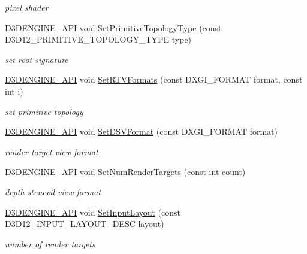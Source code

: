 \begin{DoxyCompactItemize}
\begin{DoxyCompactList}\small\item\em pixel shader \end{DoxyCompactList}\item 
\mbox{\hyperlink{stdafx_8h_a8ee2d990c5dfba7794dd2b60741d7722}{D3\+D\+E\+N\+G\+I\+N\+E\+\_\+\+A\+PI}} void \mbox{\hyperlink{class_p_s_o_manager_a3132d5f40a8a9ddde43be8e30b35d7a6}{Set\+Primitive\+Topology\+Type}} (const D3\+D12\+\_\+\+P\+R\+I\+M\+I\+T\+I\+V\+E\+\_\+\+T\+O\+P\+O\+L\+O\+G\+Y\+\_\+\+T\+Y\+PE type)
\begin{DoxyCompactList}\small\item\em set root signature \end{DoxyCompactList}\item 
\mbox{\hyperlink{stdafx_8h_a8ee2d990c5dfba7794dd2b60741d7722}{D3\+D\+E\+N\+G\+I\+N\+E\+\_\+\+A\+PI}} void \mbox{\hyperlink{class_p_s_o_manager_af22ff455998aed24fb064297a0578125}{Set\+R\+T\+V\+Formats}} (const D\+X\+G\+I\+\_\+\+F\+O\+R\+M\+AT format, const int i)
\begin{DoxyCompactList}\small\item\em set primitive topology \end{DoxyCompactList}\item 
\mbox{\hyperlink{stdafx_8h_a8ee2d990c5dfba7794dd2b60741d7722}{D3\+D\+E\+N\+G\+I\+N\+E\+\_\+\+A\+PI}} void \mbox{\hyperlink{class_p_s_o_manager_ae0c03ebf488a4ec5097619a175cafc73}{Set\+D\+S\+V\+Format}} (const D\+X\+G\+I\+\_\+\+F\+O\+R\+M\+AT format)
\begin{DoxyCompactList}\small\item\em render target view format \end{DoxyCompactList}\item 
\mbox{\hyperlink{stdafx_8h_a8ee2d990c5dfba7794dd2b60741d7722}{D3\+D\+E\+N\+G\+I\+N\+E\+\_\+\+A\+PI}} void \mbox{\hyperlink{class_p_s_o_manager_a41cbdf6b07c2dcbc9c740c9bc116adc5}{Set\+Num\+Render\+Targets}} (const int count)
\begin{DoxyCompactList}\small\item\em depth stencvil view format \end{DoxyCompactList}\item 
\mbox{\hyperlink{stdafx_8h_a8ee2d990c5dfba7794dd2b60741d7722}{D3\+D\+E\+N\+G\+I\+N\+E\+\_\+\+A\+PI}} void \mbox{\hyperlink{class_p_s_o_manager_ab3ef568d2a3c5e02fdb3b2c490921b54}{Set\+Input\+Layout}} (const D3\+D12\+\_\+\+I\+N\+P\+U\+T\+\_\+\+L\+A\+Y\+O\+U\+T\+\_\+\+D\+E\+SC layout)
\begin{DoxyCompactList}\small\item\em number of render targets \end{DoxyCompactList}\end{DoxyCompactItemize}
